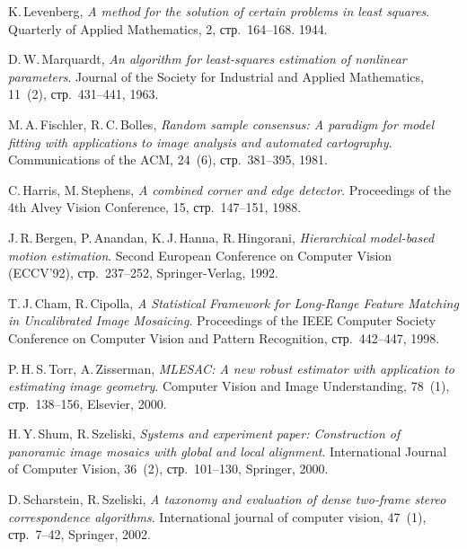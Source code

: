 \documentclass[a4paper,12pt]{article}
\begin{document}
\begin{thebibliography}{99}

  K.\,Levenberg,
  \emph{A method for the solution of certain problems in least squares}.
  Quarterly of Applied Mathematics, 
  2,
  стр.~164--168.
  1944.

   D.\,W.\,Marquardt,
   \emph{An algorithm for least-squares estimation of nonlinear parameters}.
   Journal of the Society for Industrial and Applied Mathematics,
   11~(2),
   стр.~431--441,
   1963.

  M.\,A.\,Fischler, R.\,C.\,Bolles,
  \emph{Random sample consensus: A paradigm for model fitting with applications to image analysis and automated cartography}.
  Communications of the ACM, 
  24~(6),
  стр.~381--395,
  1981.
 
  C.\,Harris, M.\,Stephens,
  \emph{A combined corner and edge detector}.
  Proceedings of the 4th Alvey Vision Conference,
  15,
  стр.~147--151,
  1988.

  J.\,R.\,Bergen, P.\,Anandan, K.\,J.\,Hanna, R.\,Hingorani, 
  \emph{Hierarchical model-based motion estimation}.
  Second European Conference on Computer Vision (ECCV’92), 
  стр.~237--252,
  Springer-Verlag, 
  1992.

  T.\,J.\,Cham, R.\,Cipolla,
  \emph{A Statistical Framework for Long-Range Feature Matching in Uncalibrated Image Mosaicing}.
  Proceedings of the IEEE Computer Society Conference on Computer Vision and Pattern Recognition,
  стр.~442--447,
  1998.

  P.\,H.\,S.\,Torr, A.\,Zisserman,
  \emph{MLESAC: A new robust estimator with application to estimating image geometry}.
  Computer Vision and Image Understanding,
  78~(1),
  стр.~138--156,
  Elsevier,
  2000.
  
  H.\,Y.\,Shum, R.\,Szeliski,
  \emph{Systems and experiment paper: Construction of panoramic image mosaics with global and local alignment}.
  International Journal of Computer Vision,
  36~(2),
  стр.~101--130,
  Springer,
  2000.
  
  D.\,Scharstein, R.\,Szeliski,
  \emph{A taxonomy and evaluation of dense two-frame stereo correspondence algorithms}.
  International journal of computer vision,
  47~(1),
  стр.~7--42,
  Springer,
  2002.


\end{thebibliography}
\end{document}
